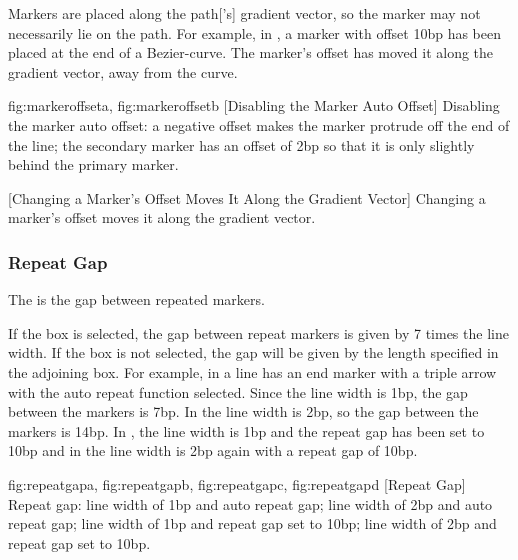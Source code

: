 \begin{information}
Markers are placed along the \gls{path}['s] gradient
vector, so the marker may not necessarily lie on the \gls*{path}. For
example, in , a marker with offset 10\gls{bp}
has been placed at the end of a \gls{Bezier-curve}. The marker's offset
has moved it along the gradient vector, away from the curve.
\end{information}

{
  {fig:markeroffseta}{}{},
  {fig:markeroffsetb}{}{}
}
[Disabling the Marker Auto Offset]
{Disabling the marker auto offset:
 a negative offset makes the marker protrude off
the end of the line;
 the secondary marker has an offset
of 2bp so that it is only slightly behind the primary marker.}

{}
[Changing a Marker's Offset Moves It Along the Gradient Vector]
{Changing a marker's offset moves it along the gradient vector.}

\subsubsection{Repeat Gap}\label{sec:repeatgap}

The  is the gap between
repeated markers.


If the  box is selected, the gap
between repeat markers is given by 7 times the line width. If the
 box is not selected, the gap will be given by the length specified
in the adjoining box. For example, in 
a line has an end marker with a triple arrow with
the auto repeat function selected. Since the line width is 1\gls{bp}, the
gap between the markers is 7\gls{bp}. In 
the line width is 2\gls{bp}, so the gap between the markers is 14\gls{bp}. In
, the line width is 1\gls{bp} and the repeat
gap has been set to 10\gls{bp} and in 
the line width is 2\gls{bp} again with a repeat gap of 10\gls{bp}.

{
  {fig:repeatgapa}{}{},
  {fig:repeatgapb}{}{},
  {fig:repeatgapc}{}{},
  {fig:repeatgapd}{}{}
}
[Repeat Gap]
{Repeat gap:
 line width of 1\gls{bp} and auto repeat gap;
 line width of 2\gls{bp} and auto repeat gap;
 line width of 1\gls{bp} and repeat gap set to 10\gls{bp};
 line width of 2\gls{bp} and repeat gap set to
10\gls{bp}.}


